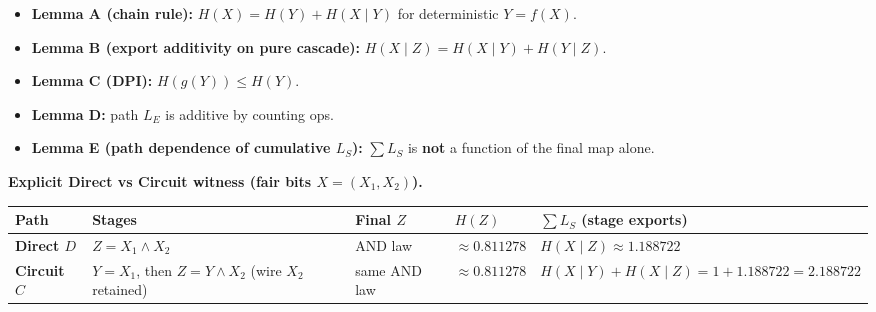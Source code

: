 \documentclass[
  11pt,
]{article}
\newcounter{none} %
\providecommand{\tightlist}{%
  \setlength{\itemsep}{0pt}\setlength{\parskip}{0pt}}
\begin{document}
\begin{itemize}
\tightlist
\item
  \textbf{Lemma A (chain rule):} \(H(X)=H(Y)+H(X\mid Y)\) for
  deterministic \(Y=f(X)\).\\
\item
  \textbf{Lemma B (export additivity on pure cascade):}
  \(H(X\mid Z)=H(X\mid Y)+H(Y\mid Z)\).\\
\item
  \textbf{Lemma C (DPI):} \(H(g(Y))\le H(Y)\).\\
\item
  \textbf{Lemma D:} path \(L_E\) is additive by counting ops.\\
\item
  \textbf{Lemma E (path dependence of cumulative \(L_S\)):} \(\sum L_S\)
  is \textbf{not} a function of the final map alone.
\end{itemize}

\textbf{Explicit Direct vs Circuit witness (fair bits \(X=(X_1,X_2)\)).}

{\def\LTcaptype{none} %
\begin{longtable}[]{@{}
  >{\raggedright\arraybackslash}p{}
  >{\raggedright\arraybackslash}p{}
  >{\raggedright\arraybackslash}p{}
  >{\raggedright\arraybackslash}p{}
  >{\raggedright\arraybackslash}p{}@{}}
\toprule\noalign{}
\begin{minipage}[b]{\linewidth}\raggedright
Path
\end{minipage} & \begin{minipage}[b]{\linewidth}\raggedright
Stages
\end{minipage} & \begin{minipage}[b]{\linewidth}\raggedright
Final \(Z\)
\end{minipage} & \begin{minipage}[b]{\linewidth}\raggedright
\(H(Z)\)
\end{minipage} & \begin{minipage}[b]{\linewidth}\raggedright
\(\sum L_S\) (stage exports)
\end{minipage} \\
\midrule\noalign{}
\endhead
\bottomrule\noalign{}
\endlastfoot
\textbf{Direct \(D\)} & \(Z=X_1\land X_2\) & AND law &
\(\approx 0.811278\) & \(H(X\mid Z)\approx 1.188722\) \\
\textbf{Circuit \(C\)} & \(Y=X_1\), then \(Z=Y\land X_2\) (wire \(X_2\)
retained) & same AND law & \(\approx 0.811278\) &
\(H(X\mid Y)+H(X\mid Z)=1+1.188722=2.188722\) \\
\end{longtable}
}
\end{document}
